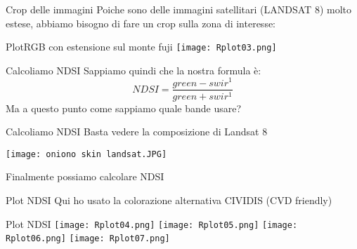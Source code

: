 \documentclass{beamer}
\begin{document}
\begin{frame}{Crop delle immagini}
Poiche sono delle immagini satellitari (LANDSAT 8) molto estese, abbiamo bisogno di fare un crop sulla zona di interesse:
\bigskip
\scriptsize
    
\end{frame}

\begin{frame}{PlotRGB con estensione sul monte fuji}
\centering
\texttt{[image: Rplot03.png]}  
    
\end{frame}

\begin{frame}{Calcoliamo NDSI}
Sappiamo quindi che la nostra formula è:
  \bigskip
  \centering
  \begin{equation}
NDSI=\frac{green-swir^1}{green+swir^1}
\nonumber
\end{equation}
\bigskip
Ma a questo punto come sappiamo quale bande usare?


\end{frame}

\begin{frame}{Calcoliamo NDSI}
\centering
Basta vedere la composizione di Landsat 8

\bigskip
\centering
\texttt{[image: oniono skin landsat.JPG]}  
\end{frame}

\begin{frame}
Finalmente possiamo calcolare NDSI
 \bigskip
 \scriptsize
\bigskip

\end{frame}

\begin{frame}{Plot NDSI}
Qui ho usato la colorazione alternativa CIVIDIS (CVD friendly)
\bigskip

\scriptsize 

\end{frame}
\begin{frame}{Plot NDSI}
\centering
\texttt{[image: Rplot04.png]}  
\texttt{[image: Rplot05.png]}  
\texttt{[image: Rplot06.png]}  
\texttt{[image: Rplot07.png]}  
    
\end{frame}
\end{document}
